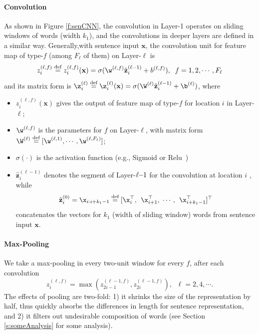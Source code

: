 \documentclass{article} %
\begin{document}
\paragraph{Convolution} \vspace{-10pt} \label{s:convunit}
As shown in Figure \ref{f:senCNN}, the convolution in Layer-1 operates on sliding windows of words (width $k_1$), and the convolutions in deeper layers are defined in a similar way. Generally,with sentence input $\mathbf{x}$, the convolution unit for feature map of type-$f$ (among $F_\ell$ of them)  on Layer-$\ell$ is
\begin{equation}
z^{(\ell, f)}_{i} \overset{\text{def}}{=}
z^{(\ell,f)}_{i}(\mathbf{x}) =  \sigma(\w^{(\ell,f)} \hat{\mathbf{z}}^{(\ell-1)}_{i} + b^{(\ell,f)}), \;\; f = 1,2,\cdots,F_{\ell}
\end{equation}
and its matrix form is $\z^{(\ell)}_{i} \overset{\text{def}}{=}\z^{(\ell)}_{i}(\mathbf{x}) =
 \sigma(\W^{(\ell)} \hat{\mathbf{z}}^{(\ell-1)}_{i} + \b^{(\ell)})$,
where
\begin{itemize}
  \item $z^{(\ell,f)}_{i}(\mathbf{x})$ gives the output of feature map of type-$f$  for location $i$ in Layer-$\ell$;
   \item $\w^{(\ell, f)}$ is the parameters for $f$ on Layer-$\ell$, with matrix form $\W^{(\ell)} \overset{\text{def}}{=} [\w^{(\ell,1)},\cdots,\w^{(\ell,F_{\ell})}] $;
   \item $\sigma(\cdot)$ is the activation function (e.g., Sigmoid or Relu~\cite{relu})
  \item $\hat{\mathbf{z}}^{(\ell-1)}_{i}$ denotes the segment of Layer-$\ell\hspace{-3pt}-\hspace{-3pt}1$ for the convolution at location $i$ , while
      \[
      \hat{\mathbf{z}}^{(0)}_{i} =  \x_{i:i+k_1-1} \overset{\text{def}}{=}  [ \x_{i}^\top, \;\, \x_{i+1}^\top,\;\cdots,\;\, \x_{i+k_1-1}^\top]^\top
      \]
      concatenates the vectors for $k_{1}$ (width of sliding window) words from sentence input $\mathbf{x}$.
\end{itemize}


\paragraph{Max-Pooling}\vspace{-10pt}
We take a max-pooling in every two-unit window for every $f$, after each convolution
\[
z_i^{(\ell,f)} = \max(z_{2i-1}^{(\ell-1,f)}, z_{2i}^{(\ell-1,f)}), \;\;\ell = 2,4,\cdots.
\]
The effects of pooling are two-fold: 1) it shrinks the size of the representation by half, thus quickly absorbs the differences in length for sentence representation, and 2) it filters out undesirable composition of words (see Section \ref{s:someAnalysis} for some analysis).
\end{document}
